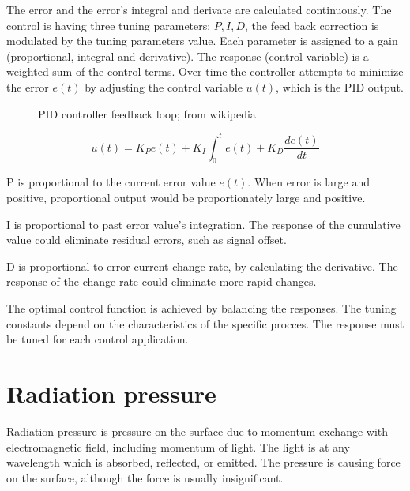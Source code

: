 \documentclass[\main/master.tex]{subfiles}
\begin{document}
\par
The error and the error's integral and derivate are calculated continuously. The control is having three tuning parameters; $P, I, D$, the feed back correction is modulated by the tuning parameters value. Each parameter is assigned to a gain (proportional, integral and derivative). The response (control variable) is a weighted sum of the control terms. Over time the controller attempts to minimize the error $e(t)$ by adjusting the control variable $u(t)$, which is the PID output.
\par
\begin{figure}[htbp]
	\centering
	\caption[PID]{PID controller feedback loop; from wikipedia}
	\label{fig:PID_scheme}
\end{figure}
\begin{equation}
u(t) = K_Pe(t)+K_I\int_{0}^{t}e(t)+K_D\frac{de(t)}{dt}   \label{eqn:PID_eq}
\end{equation}


P is proportional to the current error value $e(t)$. When error is large and positive, proportional output would be proportionately large and positive.
\par
I is proportional to past error value's integration. The response of the cumulative value could eliminate residual errors, such as signal offset.
\par
D is proportional to error current change rate, by calculating the derivative. The response of the change rate could eliminate more rapid changes.
\par
The optimal control function is achieved by balancing the responses. The tuning constants depend on the characteristics of the specific procces. The response must be tuned for each control application.  








\section{Radiation pressure}
Radiation pressure is pressure on the surface due to momentum exchange with electromagnetic field, including momentum of light. The light is at any wavelength which is absorbed, reflected, or emitted. The pressure is causing force on the surface, although the force is usually insignificant.
  
\end{document}
